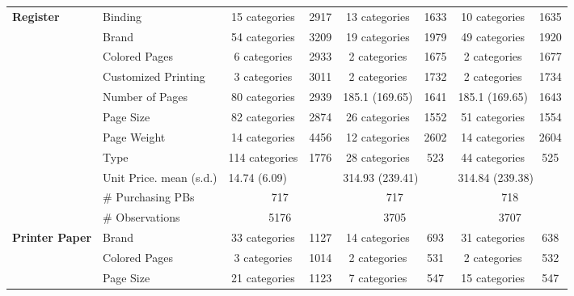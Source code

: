\begin{longtable}{llccccccccc}
 \midrule 
 \multirow{11}{*}{\textbf{Register}} & Binding & \multicolumn{2}{c}{15 categories} & 2917 & \multicolumn{2}{c}{13 categories} & 1633 & \multicolumn{2}{c}{10 categories} & 1635 \\* 
 & Brand & \multicolumn{2}{c}{54 categories} & 3209 & \multicolumn{2}{c}{19 categories} & 1979 & \multicolumn{2}{c}{49 categories} & 1920 \\* 
 & Colored Pages & \multicolumn{2}{c}{6 categories} & 2933 & \multicolumn{2}{c}{2 categories} & 1675 & \multicolumn{2}{c}{2 categories} & 1677 \\* 
 & Customized Printing & \multicolumn{2}{c}{3 categories} & 3011 & \multicolumn{2}{c}{2 categories} & 1732 & \multicolumn{2}{c}{2 categories} & 1734 \\* 
 & Number of Pages & \multicolumn{2}{c}{80 categories} & 2939 & \multicolumn{2}{c}{185.1 (169.65)} & 1641 & \multicolumn{2}{c}{185.1 (169.65)} & 1643 \\* 
 & Page Size & \multicolumn{2}{c}{82 categories} & 2874 & \multicolumn{2}{c}{26 categories} & 1552 & \multicolumn{2}{c}{51 categories} & 1554 \\* 
 & Page Weight & \multicolumn{2}{c}{14 categories} & 4456 & \multicolumn{2}{c}{12 categories} & 2602 & \multicolumn{2}{c}{14 categories} & 2604 \\* 
 & Type & \multicolumn{2}{c}{114 categories} & 1776 & \multicolumn{2}{c}{28 categories} & 523 & \multicolumn{2}{c}{44 categories} & 525 \\* 
 \nopagebreak \cmidrule{2-11} 
 \nopagebreak & Unit Price. mean (s.d.) & \multicolumn{3}{l}{14.74 (6.09)} & \multicolumn{3}{l}{314.93 (239.41)} & \multicolumn{3}{l}{314.84 (239.38)} \\* 
 \nopagebreak & \# Purchasing PBs & \multicolumn{3}{c}{717} & \multicolumn{3}{c}{717} & \multicolumn{3}{c}{718} \\* 
 \nopagebreak & \# Observations & \multicolumn{3}{c}{5176} & \multicolumn{3}{c}{3705} & \multicolumn{3}{c}{3707} \\* 
 \midrule 
 \multirow{7}{*}{\textbf{Printer Paper}} & Brand & \multicolumn{2}{c}{33 categories} & 1127 & \multicolumn{2}{c}{14 categories} & 693 & \multicolumn{2}{c}{31 categories} & 638 \\* 
 & Colored Pages & \multicolumn{2}{c}{3 categories} & 1014 & \multicolumn{2}{c}{2 categories} & 531 & \multicolumn{2}{c}{2 categories} & 532 \\* 
 & Page Size & \multicolumn{2}{c}{21 categories} & 1123 & \multicolumn{2}{c}{7 categories} & 547 & \multicolumn{2}{c}{15 categories} & 547 \\* 

\end{longtable}
